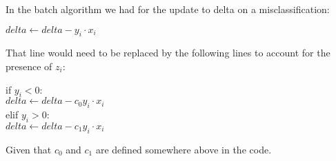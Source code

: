 \documentclass{article}
\begin{document}
In the batch algorithm we had for the update to delta on a misclassification:

\vspace{1em}

$delta \leftarrow delta - y_i \cdot x_i$

\vspace{1em}

That line would need to be replaced by the following lines to account for the
presence of $z_i$:

\vspace{1em}

if $y_i < 0$:\\
\hspace{2em} $delta \leftarrow delta - c_0 y_i \cdot x_i$\\
elif $y_i > 0$:\\
\hspace{2em} $delta \leftarrow delta - c_1 y_i \cdot x_i$\\

\vspace{1em}

Given that $c_0$ and $c_1$ are defined somewhere above in the code.
\end{document}
